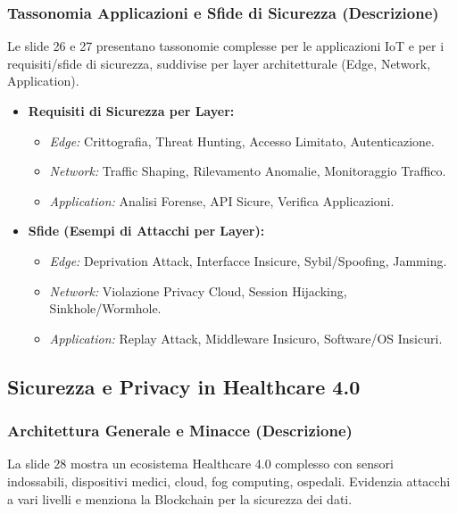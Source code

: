 \subsubsection{Tassonomia Applicazioni e Sfide di Sicurezza (Descrizione)}
Le slide 26 e 27 presentano tassonomie complesse per le applicazioni IoT e per i requisiti/sfide di sicurezza, suddivise per layer architetturale (Edge, Network, Application).
\begin{itemize}
    \item \textbf{Requisiti di Sicurezza per Layer:}
    \begin{itemize}
        \item \textit{Edge:} Crittografia, Threat Hunting, Accesso Limitato, Autenticazione.
        \item \textit{Network:} Traffic Shaping, Rilevamento Anomalie, Monitoraggio Traffico.
        \item \textit{Application:} Analisi Forense, API Sicure, Verifica Applicazioni.
    \end{itemize}
    \item \textbf{Sfide (Esempi di Attacchi per Layer):}
    \begin{itemize}
        \item \textit{Edge:} Deprivation Attack, Interfacce Insicure, Sybil/Spoofing, Jamming.
        \item \textit{Network:} Violazione Privacy Cloud, Session Hijacking, Sinkhole/Wormhole.
        \item \textit{Application:} Replay Attack, Middleware Insicuro, Software/OS Insicuri.
    \end{itemize}
\end{itemize}

\subsection{Sicurezza e Privacy in Healthcare 4.0}

\subsubsection{Architettura Generale e Minacce (Descrizione)}
La slide 28 mostra un ecosistema Healthcare 4.0 complesso con sensori indossabili, dispositivi medici, cloud, fog computing, ospedali. Evidenzia attacchi a vari livelli e menziona la Blockchain per la sicurezza dei dati.

